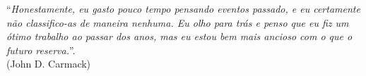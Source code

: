 \thispagestyle{empty}
\begin{center}
%
\end{center}
\vspace{18cm}

\begin{flushright}
``\emph{Honestamente, eu gasto pouco tempo pensando eventos passado, e eu
certamente não classifico-as de maneira nenhuma. Eu olho para trás e
penso que eu fiz um ótimo trabalho ao passar dos anos, mas eu estou
bem mais ancioso com o que o futuro reserva.}''.  \\ (John D. Carmack)
\end{flushright}
